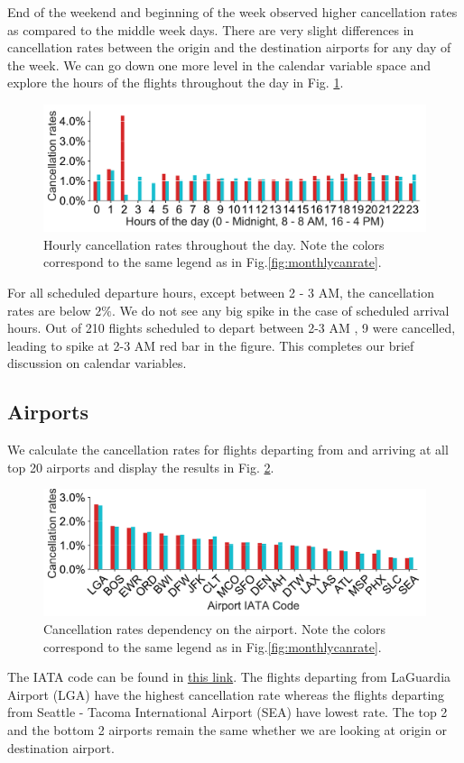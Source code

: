 \documentclass[12pt]{article}
\begin{document}
End of the weekend and beginning of the week observed higher cancellation rates as compared to the middle week days. There are very slight differences in cancellation rates between the origin and the destination airports for any day of the week. We can go down one more level in the calendar variable space and explore the hours of the flights throughout the day in Fig. \ref{fig:hourlycanrate}.
\begin{figure}[h!]
\begin{center}
\includegraphics[width=6in]{hourly_canrate.pdf}
\end{center}
\caption{\label{fig:hourlycanrate}
Hourly cancellation rates throughout the day. Note the colors correspond to the same legend as in Fig.\ref{fig:monthlycanrate}.}
\end{figure}
For all scheduled departure hours, except between 2 - 3 AM, the cancellation rates are below $2\%$. We do not see any big spike in the case of scheduled arrival hours. Out of 210 flights scheduled to depart between 2-3 AM , 9 were cancelled, leading to spike at 2-3 AM red bar in the figure. This completes our brief discussion on calendar variables.
\subsection{Airports}
\label{subsec:airports}
We calculate the cancellation rates for flights departing from and arriving at all top 20 airports and display the results in Fig. \ref{fig:airportcanrate}. 
\begin{figure}[h!]
\begin{center}
\includegraphics[width=6in]{airport_canrate.pdf}
\end{center}
\caption{\label{fig:airportcanrate}
Cancellation rates dependency on the airport. Note the colors correspond to the same legend as in Fig.\ref{fig:monthlycanrate}.}
\end{figure}
The IATA code can be found in \href{http://www.iata.org/publications/Pages/code-search.aspx}{this link}.
The flights departing from LaGuardia Airport (LGA) have the highest cancellation rate whereas the flights departing from Seattle - Tacoma International Airport (SEA) have lowest rate. The top 2 and the bottom 2 airports remain the same whether we are looking at origin or destination airport. 
\end{document}
